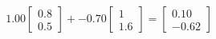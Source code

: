 \documentclass[preview]{standalone}
\begin{document}
\begin{align*}
1.00 \begin{bmatrix} 0.8 \\ 0.5 \end{bmatrix} + -0.70 \begin{bmatrix} 1 \\ 1.6 \end{bmatrix} = \begin{bmatrix} 0.10 \\ -0.62 \end{bmatrix}
\end{align*}
\end{document}

